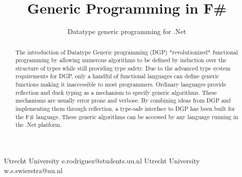 \documentclass{sigplanconf}
\begin{document}
\setlength{\pdfpageheight}{\paperheight}
\setlength{\pdfpagewidth}{\paperwidth}






\title{Generic Programming in F\#}
\subtitle{Datatype generic programming for .Net}

           {Utrecht University}
           {e.rodriguez@students.uu.nl}
           {Utrecht University}
           {w.s.swierstra@uu.nl}

\maketitle

\begin{abstract}
The introduction of Datatype Generic programming (DGP) *revolutionized* functional programming by allowing numerous algorithms to be defined by induction over the structure of types while still providing type safety. Due to the advanced type system requirements for DGP, only a handful of functional languages can define generic functions making it inaccessible to most programmers. Ordinary languages provide reflection and duck typing as a mechanism to specify generic algorithms. These mechanisms are usually error prone and verbose. By combining ideas from DGP and implementing them through reflection, a type-safe interface to DGP has been built for the F\# language. These generic algorithms can be accessed by any language running in the .Net platform.
\end{abstract}

\end{document}
